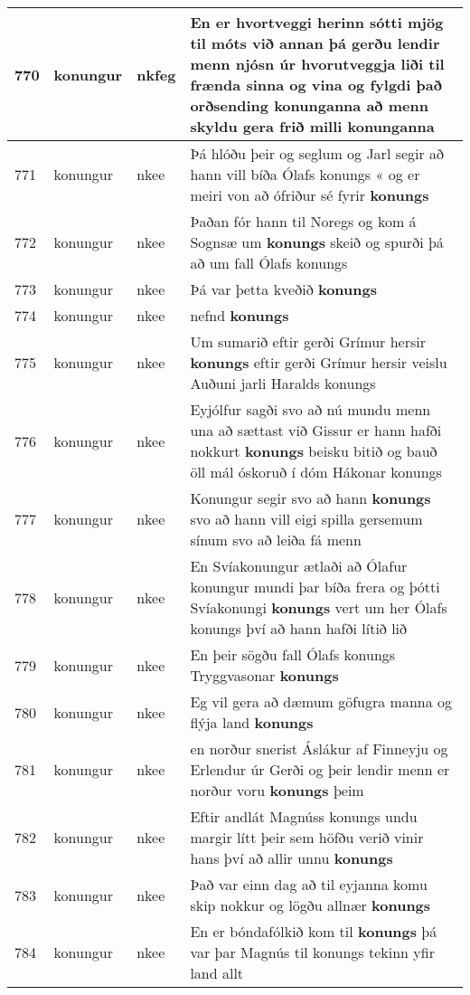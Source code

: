 \documentclass{article}
\begin{document}
\begin{longtable}{p{1cm}|p{1cm}|p{1cm}|p{13cm}}
\hline
770&konungur&nkfeg&En er hvortveggi herinn sótti mjög til móts við annan þá gerðu lendir menn njósn úr hvorutveggja liði til frænda sinna og vina og fylgdi það orðsending \textbf{konunganna} að menn skyldu gera frið milli konunganna\\
\hline
771&konungur&nkee&Þá hlóðu þeir og seglum og Jarl segir að hann vill bíða Ólafs konungs « og er meiri von að ófriður sé fyrir \textbf{konungs} \\
\hline
772&konungur&nkee&Þaðan fór hann til Noregs og kom á Sognsæ um \textbf{konungs} skeið og spurði þá að um fall Ólafs konungs\\
\hline
773&konungur&nkee&Þá var þetta kveðið \textbf{konungs} \\
\hline
774&konungur&nkee&nefnd \textbf{konungs} \\
\hline
775&konungur&nkee&Um sumarið eftir gerði Grímur hersir \textbf{konungs} eftir gerði Grímur hersir veislu Auðuni jarli Haralds konungs\\
\hline
776&konungur&nkee&Eyjólfur sagði svo að nú mundu menn una að sættast við Gissur er hann hafði nokkurt \textbf{konungs} beisku bitið og bauð öll mál óskoruð í dóm Hákonar konungs\\
\hline
777&konungur&nkee&Konungur segir svo að hann \textbf{konungs} svo að hann vill eigi spilla gersemum sínum svo að leiða fá menn\\
\hline
778&konungur&nkee&En Svíakonungur ætlaði að Ólafur konungur mundi þar bíða frera og þótti Svíakonungi \textbf{konungs} vert um her Ólafs konungs því að hann hafði lítið lið\\
\hline
779&konungur&nkee&En þeir sögðu fall Ólafs konungs Tryggvasonar \textbf{konungs} \\
\hline
780&konungur&nkee&Eg vil gera að dæmum göfugra manna og flýja land \textbf{konungs} \\
\hline
781&konungur&nkee&en norður snerist Áslákur af Finneyju og Erlendur úr Gerði og þeir lendir menn er norður voru \textbf{konungs} þeim\\
\hline
782&konungur&nkee&Eftir andlát Magnúss konungs undu margir lítt þeir sem höfðu verið vinir hans því að allir unnu \textbf{konungs} \\
\hline
783&konungur&nkee&Það var einn dag að til eyjanna komu skip nokkur og lögðu allnær \textbf{konungs} \\
\hline
784&konungur&nkee&En er bóndafólkið kom til \textbf{konungs} þá var þar Magnús til konungs tekinn yfir land allt\\
\hline

\end{longtable}
\end{document}
